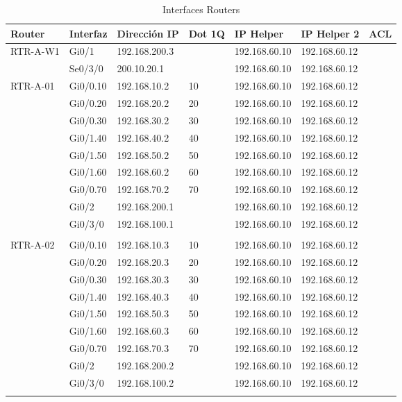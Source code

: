 \documentclass[a4paper,onecolumn,11pt]{article}
\begin{document}
\begin{table}[htbp]
\small \sffamily
\caption{Interfaces Routers}
\begin{center}
\begin{tabular}{p{}p{}p{}p{}p{}p{}p{}}
\toprule
\textbf{Router} & \textbf{Interfaz} & \textbf{Dirección IP} & \textbf{Dot 1Q} & \textbf{IP Helper} & \textbf{IP Helper 2} & \textbf{ACL} \\
\toprule 
RTR-A-W1 & Gi0/1 & 192.168.200.3 &  & 192.168.60.10 & 192.168.60.12 &	 \\ %
& Se0/3/0 & 200.10.20.1 &  & 192.168.60.10 & 192.168.60.12 &  \\ \midrule

RTR-A-01 & Gi0/0.10	& 192.168.10.2 & 10 & 192.168.60.10 & 192.168.60.12 & \\
&Gi0/0.20 & 192.168.20.2 & 20 & 192.168.60.10 & 192.168.60.12 & \\
&Gi0/0.30 & 192.168.30.2 & 30 & 192.168.60.10 & 192.168.60.12 & \\
&Gi0/1.40 & 192.168.40.2 & 40 & 192.168.60.10 & 192.168.60.12 & \\
&Gi0/1.50 & 192.168.50.2 & 50 & 192.168.60.10 & 192.168.60.12 & \\
&Gi0/1.60 & 192.168.60.2 & 60 & 192.168.60.10 & 192.168.60.12 & \\
&Gi0/0.70 & 192.168.70.2 & 70 & 192.168.60.10 & 192.168.60.12 & \\
&Gi0/2    & 192.168.200.1 &   & 192.168.60.10 & 192.168.60.12 & \\
&Gi0/3/0  & 192.168.100.1 &   & 192.168.60.10 & 192.168.60.12 & \\\\ \midrule

RTR-A-02 & Gi0/0.10	& 192.168.10.3 & 10 & 192.168.60.10 & 192.168.60.12 & \\
&Gi0/0.20 & 192.168.20.3 & 20 & 192.168.60.10 & 192.168.60.12 & \\
&Gi0/0.30 & 192.168.30.3 & 30 & 192.168.60.10 & 192.168.60.12 & \\
&Gi0/1.40 & 192.168.40.3 & 40 & 192.168.60.10 & 192.168.60.12 & \\
&Gi0/1.50 & 192.168.50.3 & 50 & 192.168.60.10 & 192.168.60.12 & \\
&Gi0/1.60 & 192.168.60.3 & 60 & 192.168.60.10 & 192.168.60.12 & \\
&Gi0/0.70 & 192.168.70.3 & 70 & 192.168.60.10 & 192.168.60.12 & \\
&Gi0/2    & 192.168.200.2 &   & 192.168.60.10 & 192.168.60.12 & \\
&Gi0/3/0  & 192.168.100.2 &   & 192.168.60.10 & 192.168.60.12 & \\\\ \midrule


\end{tabular}
\end{center}
\end{table}
\end{document}
